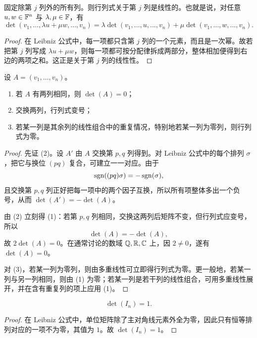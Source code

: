 \begin{proposition}[多重线性]
固定除第 $j$ 列外的所有列。则行列式关于第 $j$ 列是线性的。也就是说，对任意 $u,w\in\mathbb{F}^n$ 与 $\lambda,\mu\in\mathbb{F}$，有
\[
\det(v_1,\dots,\lambda u+\mu w,\dots,v_n)
=\lambda\det(v_1,\dots,u,\dots,v_n)+\mu\det(v_1,\dots,w,\dots,v_n).
\]
\end{proposition}

\begin{proof}
在 Leibniz 公式中，每一项都只含第 $j$ 列的一个元素，而且是一次幂。故若把第 $j$ 列写成 $\lambda u+\mu w$，则每一项都可按分配律拆成两部分，整体相加便得到右边的两项之和。这正是关于第 $j$ 列的线性性。
\end{proof}

\begin{proposition}[交错性]
设 $A=(v_1,\dots,v_n)$。
\begin{enumerate}[label=(\arabic*)]
  \item 若 $A$ 有两列相同，则 $\det(A)=0$；
  \item 交换两列，行列式变号；
  \item 若某一列是其余列的线性组合中的重复情况，特别地若某一列为零列，则行列式为零。
\end{enumerate}
\end{proposition}

\begin{proof}
先证 (2)。设 $A'$ 由 $A$ 交换第 $p,q$ 列得到。对 Leibniz 公式中的每个排列 $\sigma$，把它与换位 $(pq)$ 复合，可建立一一对应。由于
\[
\operatorname{sgn}((pq)\sigma)=-\operatorname{sgn}(\sigma),
\]
且交换第 $p,q$ 列正好把每一项中的两个因子互换，所以所有项整体多出一个负号，从而 $\det(A')=-\det(A)$。

由 (2) 立刻得 (1)：若第 $p,q$ 列相同，交换这两列后矩阵不变，但行列式应变号，所以
\[
\det(A)=-\det(A),
\]
故 $2\det(A)=0$。在通常讨论的数域 $\mathbb{Q},\mathbb{R},\mathbb{C}$ 上，因 $2\ne0$，遂有 $\det(A)=0$。

对 (3)，若某一列为零列，则由多重线性可立即得行列式为零。更一般地，若某一列与另一列相同，则由 (1) 为零；若某一列是若干列的线性组合，可用多重线性展开，并在含有重复列的项上应用 (1)。
\end{proof}

\begin{proposition}[标准化]
\[
\det(I_n)=1.
\]
\end{proposition}

\begin{proof}
在 Leibniz 公式中，单位矩阵除了主对角线元素外全为零，因此只有恒等排列对应的一项不为零，其值为 $1$。故 $\det(I_n)=1$。
\end{proof}

